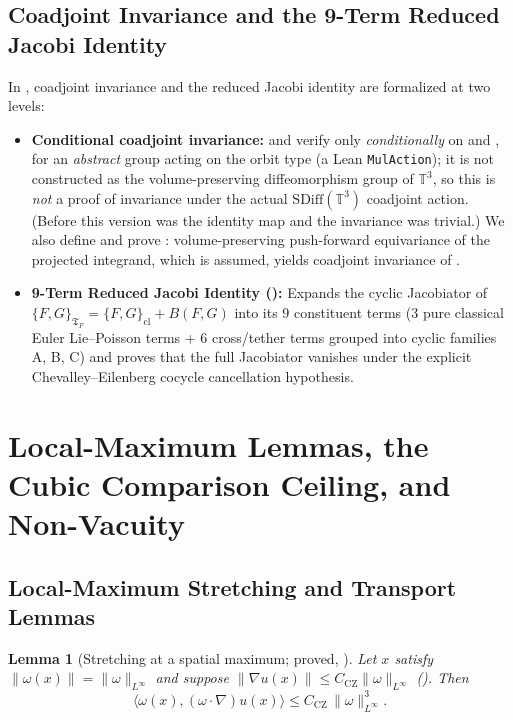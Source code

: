 \documentclass[11pt,a4paper]{article}
\theoremstyle{plain}
\newtheorem{lemma}{Lemma}[section]
\theoremstyle{definition}
\theoremstyle{remark}
\newcommand{\T}{\mathbb{T}^3}
\newcommand{\Tf}{\mathfrak{T}_F}
\newcommand{\CZ}{C_{\mathrm{CZ}}}
\begin{document}
\subsection{Coadjoint Invariance and the 9-Term Reduced Jacobi Identity}
In , coadjoint invariance and the reduced Jacobi identity are formalized at two levels:
\begin{itemize}
\item \textbf{Conditional coadjoint invariance:}  and  verify  only \emph{conditionally} on  and , for an \emph{abstract} group acting on the orbit type (a Lean \texttt{MulAction}); it is not constructed as the volume-preserving diffeomorphism group of $\T$, so this is \emph{not} a proof of invariance under the actual $\mathrm{SDiff}(\T)$ coadjoint action. (Before this version  was the identity map and the invariance was trivial.) We also define  and prove : volume-preserving push-forward equivariance of the projected integrand, which is assumed, yields coadjoint invariance of .
\item \textbf{9-Term Reduced Jacobi Identity ():} Expands the cyclic Jacobiator of $\{F,G\}_{\Tf}=\{F,G\}_{\mathrm{cl}}+B(F,G)$ into its 9 constituent terms (3 pure classical Euler Lie--Poisson terms + 6 cross/tether terms grouped into cyclic families A, B, C) and proves that the full Jacobiator vanishes under the explicit Chevalley--Eilenberg cocycle cancellation hypothesis.
\end{itemize}

\section{Local-Maximum Lemmas, the Cubic Comparison Ceiling, and Non-Vacuity}\label{sec:cubic}

\subsection{Local-Maximum Stretching and Transport Lemmas}
\begin{lemma}[Stretching at a spatial maximum; proved, ]\label{lem:localmax}
Let $x$ satisfy $\|\omega(x)\|=\|\omega\|_{L^\infty}$ and suppose $\|\nabla u(x)\|\le\CZ\|\omega\|_{L^\infty}$ (). Then
\[
\langle\omega(x),(\omega\cdot\nabla)u(x)\rangle\le\CZ\,\|\omega\|_{L^\infty}^3 .
\]
\end{lemma}
\end{document}
